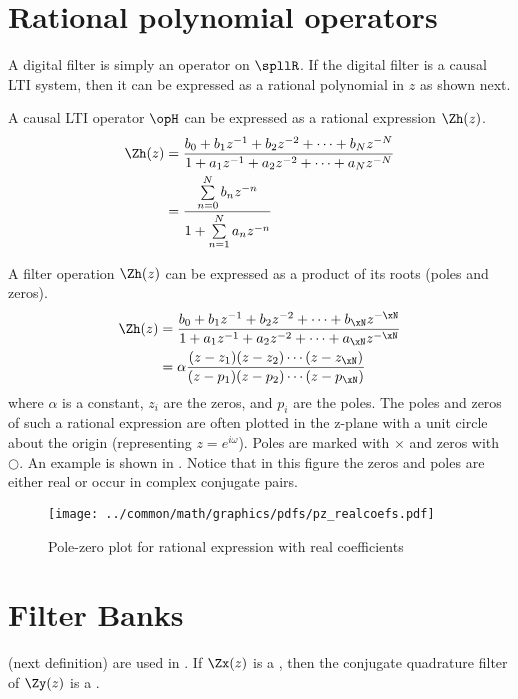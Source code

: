 \section{Rational polynomial operators}
A digital filter is simply an operator on $\spllR$.
If the digital filter is a causal LTI system, then it can be expressed as
a rational polynomial in $z$ as shown next.

\begin{lemma}
A causal LTI operator $\opH$ can be expressed as a rational expression $\Zh(z)$.
\begin{align*}
 \Zh(z) &= \frac{b_0 + b_1z^{-1} + b_2z^{-2} + \cdots + b_Nz^{-N}}
                {1   + a_1z^{-1} + a_2z^{-2} + \cdots + a_Nz^{-N}}
   \\   &= \frac{\sum\limits_{n=0}^{N} b_n z^{-n}}
                {1   + \sum\limits_{n=1}^{N} a_n z^{-n}}
\end{align*}
\end{lemma}

A filter operation $\Zh(z)$ can be expressed as a product of its roots (poles and zeros).
\begin{align*}
 \Zh(z) &= \frac{b_0 + b_1z^{-1} + b_2z^{-2} + \cdots + b_\xN z^{-\xN}}
                {1   + a_1z^{-1} + a_2z^{-2} + \cdots + a_\xN z^{-\xN}}
   \\   &= \alpha\frac{(z-z_1)(z-z_2)\cdots(z-z_\xN)}
                {(z-p_1)(z-p_2)\cdots(z-p_\xN)}
\end{align*}
where $\alpha$ is a constant, $z_i$ are the zeros, and $p_i$ are the poles.
The poles and zeros of such a rational expression are often plotted in the z-plane with a unit circle
about the origin (representing $z=e^{i\omega}$).
Poles are marked with $\times$ and zeros with $\bigcirc$.
An example is shown in .
Notice that in this figure the zeros and poles are either real or occur in
complex conjugate pairs.

\begin{figure}[ht]
  \centering
  \texttt{[image: ../common/math/graphics/pdfs/pz\_realcoefs.pdf]}
  \caption{
     Pole-zero plot for rational expression with real coefficients
     \label{fig:pz}
     }
\end{figure}

\section{Filter Banks}
 (next definition) are used in .
If $\Zx(z)$ is a , then the conjugate quadrature filter of $\Zy(z)$ is a .

